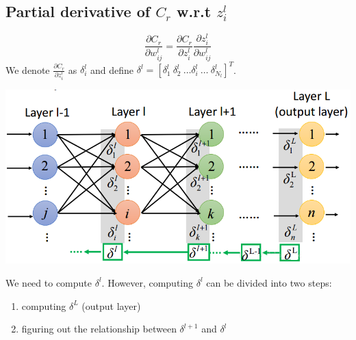 \documentclass{article}
\begin{document}
\subsection{Partial derivative of $C_r$ w.r.t $z^l_{i}$}
\[
\frac{\partial C_r}{\partial w^l_{ij}} = \frac{\partial C_r}{\partial z^l_i}\frac{\partial z^l_i}{\partial w^l_{ij}}
\]
We denote $\frac{\partial C_r}{\partial z^l_i}$ as $\delta^l_i$ and define $\delta^l = [\delta^l_1 \: \delta^l_2 \: \dots \delta^l_i \: \dots \: \delta^l_{N_l}]^T$.

\begin{center}
\includegraphics[scale=0.4]{delta}
\end{center}

We need to compute $\delta^l$. However, computing $\delta^l$ can be divided into two steps:
\begin{enumerate}
\item
computing $\delta^L$ (output layer)
\item
figuring out the relationship between $\delta^{l+1}$ and $\delta^l$ 
\end{enumerate}
\end{document}
